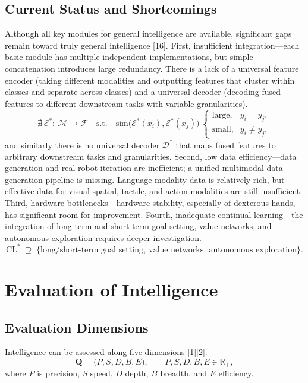 \documentclass[12pt,a4paper]{article}
\begin{document}
\subsection{Current Status and Shortcomings}
Although all key modules for general intelligence are available, significant gaps remain toward truly general intelligence [16].
First, insufficient integration---each basic module has multiple independent implementations, but simple concatenation introduces large redundancy. There is a lack of a universal feature encoder (taking different modalities and outputting features that cluster within classes and separate across classes) and a universal decoder (decoding fused features to different downstream tasks with variable granularities).
\begin{equation}
\nexists\ \mathcal{E}^{*}:\ \mathcal{M}\to\mathcal{F}\quad\text{s.t.}\quad
\mathrm{sim}\bigl(\mathcal{E}^{*}(x_i),\mathcal{E}^{*}(x_j)\bigr)\ \begin{cases}
\text{large}, & y_i=y_j,\\
\text{small}, & y_i\neq y_j,
\end{cases}
\label{eq:universal-encoder-gap}
\end{equation}
and similarly there is no universal decoder $\mathcal{D}^{*}$ that maps fused features to arbitrary downstream tasks and granularities.
Second, low data efficiency---data generation and real-robot iteration are inefficient; a unified multimodal data generation pipeline is missing. Language-modality data is relatively rich, but effective data for visual-spatial, tactile, and action modalities are still insufficient.
Third, hardware bottlenecks---hardware stability, especially of dexterous hands, has significant room for improvement.
Fourth, inadequate continual learning---the integration of long-term and short-term goal setting, value networks, and autonomous exploration requires deeper investigation.
\begin{equation}
\mathrm{CL}^{*}\;\supseteq\;\bigl\{\text{long/short-term goal setting},\ \text{value networks},\ \text{autonomous exploration}\bigr\}.
\label{eq:continual-learning-need}
\end{equation}

\section{Evaluation of Intelligence}
\subsection{Evaluation Dimensions}
Intelligence can be assessed along five dimensions [1][2]:
\begin{equation}
\mathbf{Q}=\bigl(P,S,D,B,E\bigr),\qquad
P,S,D,B,E\in\mathbb{R}_{+},
\label{eq:eval-vector}
\end{equation}
where $P$ is precision, $S$ speed, $D$ depth, $B$ breadth, and $E$ efficiency.
\end{document}
